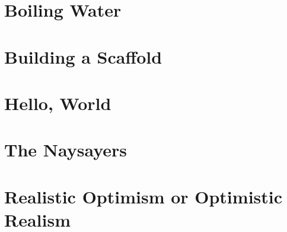 \documentclass[12pt]{memoir}
\begin{document}
	\chapter{Boiling Water}
	
	\chapter{Building a Scaffold}
	
	\chapter{Hello, World}
	
	\chapter{The Naysayers}
	
	\chapter{Realistic Optimism or Optimistic Realism}
	
\end{document}
